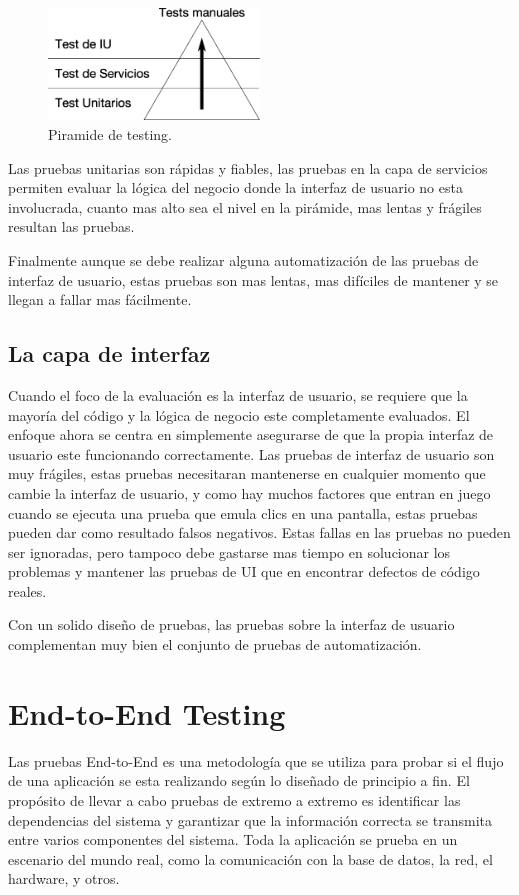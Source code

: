 \begin{figure}
\centering
\includegraphics[width=0.5\textwidth]{graphics/pyramid.eps}
\caption{Piramide de testing.}
\label{piramide}
\end{figure}

Las pruebas unitarias son rápidas y fiables, las pruebas en la capa de servicios
permiten evaluar la lógica del negocio donde la interfaz de usuario no esta
involucrada, cuanto mas alto sea el nivel en la pirámide, mas lentas y frágiles
resultan las pruebas.

Finalmente aunque se debe realizar alguna automatización de las pruebas de
interfaz de usuario, estas pruebas son mas lentas, mas difíciles de mantener y
se llegan a fallar mas fácilmente.

\subsection{La capa de interfaz}
Cuando el foco de la evaluación es la interfaz de usuario, se requiere que la
mayoría del código y la lógica de negocio este completamente evaluados. El
enfoque ahora se centra en simplemente asegurarse de que la propia interfaz de
usuario este funcionando correctamente. Las pruebas de interfaz de usuario son
muy frágiles, estas pruebas necesitaran mantenerse en cualquier momento que
cambie la interfaz de usuario, y como hay muchos factores que entran en juego
cuando se ejecuta una prueba que emula clics en una pantalla, estas pruebas
pueden dar como resultado falsos negativos. Estas fallas en las pruebas no
pueden ser ignoradas, pero tampoco debe gastarse mas tiempo en solucionar los
problemas y mantener las pruebas de UI que en encontrar defectos de código
reales.

Con un solido diseño de pruebas, las pruebas sobre la interfaz de usuario
complementan muy bien el conjunto de pruebas de automatización.

\section{End-to-End Testing}
Las pruebas End-to-End es una metodología que se utiliza para probar si el flujo
de una aplicación se esta realizando según lo diseñado de principio a fin. El
propósito de llevar a cabo pruebas de extremo a extremo es identificar las
dependencias del sistema y garantizar que la información correcta se transmita
entre varios componentes del sistema. Toda la aplicación se prueba en un
escenario del mundo real, como la comunicación con la base de datos, la red, el
hardware, y otros.

